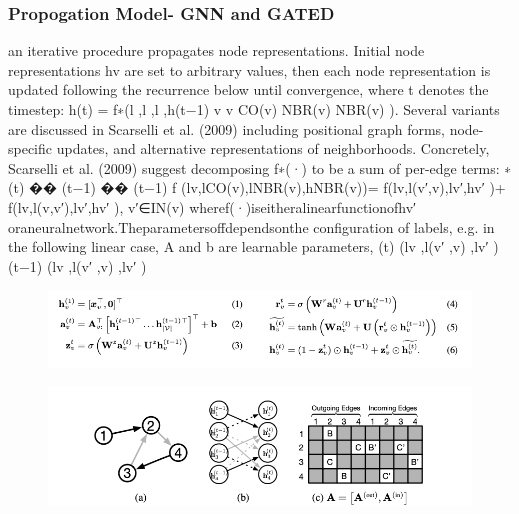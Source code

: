 \documentclass{article}
\begin{document}
\subsubsection{Propogation Model- GNN and GATED}
an iterative procedure propagates node representations. Initial node representations hv are set to arbitrary values, then each node representation is updated following the recurrence below until convergence, where t denotes the timestep:
h(t) = f∗(l ,l ,l ,h(t−1)
v v CO(v) NBR(v) NBR(v)
).
Several variants are discussed in Scarselli et al. (2009) including positional graph forms, node-specific updates, and alternative representations of neighborhoods. Concretely, Scarselli et al. (2009) suggest decomposing f∗(·) to be a sum of per-edge terms:
∗ (t) �� (t−1) �� (t−1)
f (lv,lCO(v),lNBR(v),hNBR(v))= f(lv,l(v′,v),lv′,hv′ )+ f(lv,l(v,v′),lv′,hv′ ),
v′∈IN(v)
wheref(·)iseitheralinearfunctionofhv′ oraneuralnetwork.Theparametersoffdependsonthe configuration of labels, e.g. in the following linear case, A and b are learnable parameters,
(t) (lv ,l(v′ ,v) ,lv′ ) (t−1) (lv ,l(v′ ,v) ,lv′ )

\begin{figure}[ht]
\vskip 0.2in
\begin{center}
\centerline{\includegraphics[width=\columnwidth]{Images/Bug1-1.png}}
\label{icml-historical}
\end{center}
\vskip -0.2in
\end{figure}

\begin{figure}[ht]
\vskip 0.2in
\begin{center}
\centerline{\includegraphics[width=\columnwidth]{Images/Bug1-2.png}}
\label{icml-historical}
\end{center}
\vskip -0.2in
\end{figure}
\end{document}
